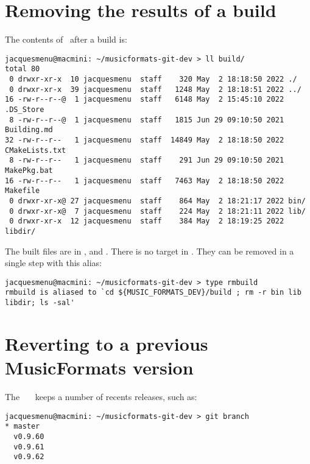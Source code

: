 \section{Removing the results of a build}

The contents of \distrib\ after a build is:
\begin{lstlisting}[language=Terminal]
jacquesmenu@macmini: ~/musicformats-git-dev > ll build/
total 80
 0 drwxr-xr-x  10 jacquesmenu  staff    320 May  2 18:18:50 2022 ./
 0 drwxr-xr-x  39 jacquesmenu  staff   1248 May  2 18:18:51 2022 ../
16 -rw-r--r--@  1 jacquesmenu  staff   6148 May  2 15:45:10 2022 .DS_Store
 8 -rw-r--r--@  1 jacquesmenu  staff   1815 Jun 29 09:10:50 2021 Building.md
32 -rw-r--r--   1 jacquesmenu  staff  14849 May  2 18:18:50 2022 CMakeLists.txt
 8 -rw-r--r--   1 jacquesmenu  staff    291 Jun 29 09:10:50 2021 MakePkg.bat
16 -rw-r--r--   1 jacquesmenu  staff   7463 May  2 18:18:50 2022 Makefile
 0 drwxr-xr-x@ 27 jacquesmenu  staff    864 May  2 18:21:17 2022 bin/
 0 drwxr-xr-x@  7 jacquesmenu  staff    224 May  2 18:21:11 2022 lib/
 0 drwxr-xr-x  12 jacquesmenu  staff    384 May  2 18:19:25 2022 libdir/
\end{lstlisting}

The built files are in ,  and . There is no  target in \Makefile. They can be removed in a single step with this alias:
\begin{lstlisting}[language=Terminal]
jacquesmenu@macmini: ~/musicformats-git-dev > type rmbuild
rmbuild is aliased to `cd ${MUSIC_FORMATS_DEV}/build ; rm -r bin lib libdir; ls -sal'
\end{lstlisting}


\section{Reverting to a previous MusicFormats version}

The \github\ \mf\ \repo\ keeps a number of recents releases, such as:
\begin{lstlisting}[language=Terminal]
jacquesmenu@macmini: ~/musicformats-git-dev > git branch
* master
  v0.9.60
  v0.9.61
  v0.9.62
\end{lstlisting}

